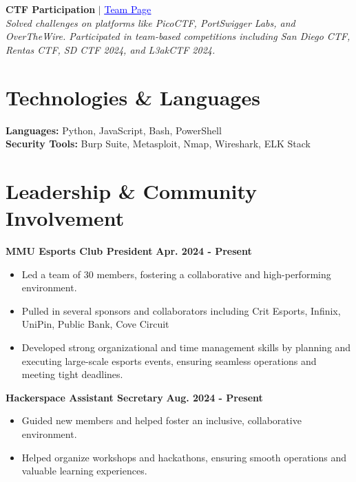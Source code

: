 \documentclass[letterpaper,11pt]{article}
\begin{document}
\vspace{2pt}

\textbf{CTF Participation} $\vert$ \href{https://ctftime.org/team/302184}{\textcolor{blue}{\underline{Team Page}}} \\
\textit{Solved challenges on platforms like PicoCTF, PortSwigger Labs, and OverTheWire. Participated in team-based competitions including San Diego CTF, Rentas CTF, SD CTF 2024, and L3akCTF 2024.}

\vspace{-5pt}

\section*{\textbf{Technologies \& Languages}}
\textbf{Languages:} Python, JavaScript, Bash, PowerShell \\
\textbf{Security Tools:} Burp Suite, Metasploit, Nmap, Wireshark, ELK Stack \\

\vspace{-5pt}

\section*{\textbf{Leadership \& Community Involvement}}
\textbf{MMU Esports Club President} \hfill \textbf{Apr. 2024 - Present} \\
\begin{itemize}[labelsep=1em, itemsep=0pt, topsep=0pt]
  \item[$\bullet$] Led a team of 30 members, fostering a collaborative and high-performing environment.
  \item[$\bullet$] Pulled in several sponsors and collaborators including Crit Esports, Infinix, UniPin, Public Bank, Cove Circuit
  \item[$\bullet$] Developed strong organizational and time management skills by planning and executing large-scale esports events, ensuring seamless operations and meeting tight deadlines.
\end{itemize}

\textbf{Hackerspace Assistant Secretary} \hfill \textbf{Aug. 2024 - Present} \\
\begin{itemize}[labelsep=1em, itemsep=0pt, topsep=0pt]
  \item[$\bullet$] Guided new members and helped foster an inclusive, collaborative environment.
  \item[$\bullet$] Helped organize workshops and hackathons, ensuring smooth operations and valuable learning experiences.
\end{itemize}

\end{document}
